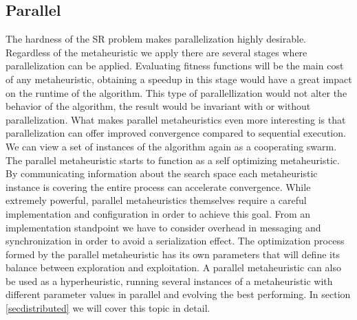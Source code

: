 \subsection{Parallel}
The hardness of the SR problem makes parallelization highly desirable. Regardless of the metaheuristic we apply there are several stages where parallelization can be applied. Evaluating fitness functions will be the main cost of any metaheuristic, obtaining a speedup in this stage would have a great impact on the runtime of the algorithm. This type of parallellization would not alter the behavior of the algorithm, the result would be invariant with or without parallelization. What makes parallel metaheuristics even more interesting is that parallelization can offer improved convergence compared to sequential execution. We can view a set of instances of the algorithm again as a cooperating swarm. The parallel metaheuristic starts to function as a self optimizing metaheuristic. By communicating information about the search space each metaheuristic instance is covering the entire process can accelerate convergence. 
While extremely powerful, parallel metaheuristics themselves require a careful implementation and configuration in order to achieve this goal. From an implementation standpoint we have to consider overhead in messaging and synchronization in order to avoid a serialization effect. The optimization process formed by the parallel metaheuristic has its own parameters that will define its balance between exploration and exploitation. A parallel metaheuristic can also be used as a hyperheuristic, running several instances of a metaheuristic with different parameter values in parallel and evolving the best performing. In section \ref{secdistributed} we will cover this topic in detail.